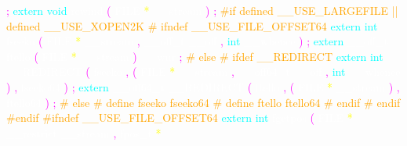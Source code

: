 \textcolor{magenta}{;} 
\textcolor{cyan}{extern} 
\textcolor{cyan}{void} 
\textcolor{white}{rewind} 
\textcolor{magenta}{(} 
\textcolor{white}{FILE} 
\textcolor{yellow}{*} 
\textcolor{white}{\_\_stream} 
\textcolor{magenta}{)} 
\textcolor{magenta}{;} 
\textcolor{orange}{\#if defined \_\_USE\_LARGEFILE || defined \_\_USE\_XOPEN2K} 
\textcolor{orange}{\# ifndef \_\_USE\_FILE\_OFFSET64} 
\textcolor{cyan}{extern} 
\textcolor{cyan}{int} 
\textcolor{white}{fseeko} 
\textcolor{magenta}{(} 
\textcolor{white}{FILE} 
\textcolor{yellow}{*} 
\textcolor{white}{\_\_stream} 
\textcolor{magenta}{,} 
\textcolor{white}{\_\_off\_t} 
\textcolor{white}{\_\_off} 
\textcolor{magenta}{,} 
\textcolor{cyan}{int} 
\textcolor{white}{\_\_whence} 
\textcolor{magenta}{)} 
\textcolor{magenta}{;} 
\textcolor{cyan}{extern} 
\textcolor{white}{\_\_off\_t} 
\textcolor{white}{ftello} 
\textcolor{magenta}{(} 
\textcolor{white}{FILE} 
\textcolor{yellow}{*} 
\textcolor{white}{\_\_stream} 
\textcolor{magenta}{)} 
\textcolor{white}{\_\_wur} 
\textcolor{magenta}{;} 
\textcolor{orange}{\# else} 
\textcolor{orange}{\# ifdef \_\_REDIRECT} 
\textcolor{cyan}{extern} 
\textcolor{cyan}{int} 
\textcolor{white}{\_\_REDIRECT} 
\textcolor{magenta}{(} 
\textcolor{white}{fseeko} 
\textcolor{magenta}{,} 
\textcolor{magenta}{(} 
\textcolor{white}{FILE} 
\textcolor{yellow}{*} 
\textcolor{white}{\_\_stream} 
\textcolor{magenta}{,} 
\textcolor{white}{\_\_off64\_t} 
\textcolor{white}{\_\_off} 
\textcolor{magenta}{,} 
\textcolor{cyan}{int} 
\textcolor{white}{\_\_whence} 
\textcolor{magenta}{)} 
\textcolor{magenta}{,} 
\textcolor{white}{fseeko64} 
\textcolor{magenta}{)} 
\textcolor{magenta}{;} 
\textcolor{cyan}{extern} 
\textcolor{white}{\_\_off64\_t} 
\textcolor{white}{\_\_REDIRECT} 
\textcolor{magenta}{(} 
\textcolor{white}{ftello} 
\textcolor{magenta}{,} 
\textcolor{magenta}{(} 
\textcolor{white}{FILE} 
\textcolor{yellow}{*} 
\textcolor{white}{\_\_stream} 
\textcolor{magenta}{)} 
\textcolor{magenta}{,} 
\textcolor{white}{ftello64} 
\textcolor{magenta}{)} 
\textcolor{magenta}{;} 
\textcolor{orange}{\# else} 
\textcolor{orange}{\# define fseeko fseeko64} 
\textcolor{orange}{\# define ftello ftello64} 
\textcolor{orange}{\# endif} 
\textcolor{orange}{\# endif} 
\textcolor{orange}{\#endif} 
\textcolor{orange}{\#ifndef \_\_USE\_FILE\_OFFSET64} 
\textcolor{cyan}{extern} 
\textcolor{cyan}{int} 
\textcolor{white}{fgetpos} 
\textcolor{magenta}{(} 
\textcolor{white}{FILE} 
\textcolor{yellow}{*} 
\textcolor{white}{\_\_restrict} 
\textcolor{white}{\_\_stream} 
\textcolor{magenta}{,} 
\textcolor{white}{fpos\_t} 
\textcolor{yellow}{*} 
